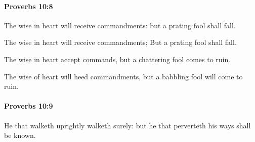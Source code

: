 		\paragraph{Proverbs 10:8} %
			\label{PROVERBS-10-8}

			The wise in heart will receive commandments: but a prating fool shall fall.

			\begin{versebox}
					\item[BHS] 
					\item[ASV] The wise in heart will receive commandments; But a prating fool shall fall.
					\item[NIV] The wise in heart accept commands, but a chattering fool comes to ruin.
					\item[NRSV] The wise of heart will heed commandments, but a babbling fool will come to ruin.
			\end{versebox}

		\paragraph{Proverbs 10:9} %
			\label{PROVERBS-10-9}

			He that walketh uprightly walketh surely: but he that perverteth his ways shall be known.


